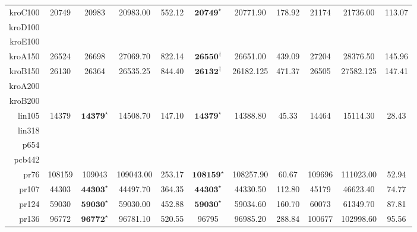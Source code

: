 \documentclass[12pt]{ctexart}
\begin{document}
\begin{table}[htbp]
\begin{tabular}{rcccccccccc}
        kroC100  & 20749            & 20983                             & 20983.00                    & 552.12                                 & $\textbf{20749}^\star$  & 20771.90         & 178.92           & 21174                 & 21736.00         & 113.07           \\
        kroD100 \\
        kroE100 \\
        kroA150  & 26524            & 26698                             & 27069.70                    & 822.14                                 & $\textbf{26550}^\dag$   & 26651.00         & 439.09           & 27204                 & 28376.50         & 145.96           \\
        kroB150  & 26130            & 26364                             & 26535.25                    & 844.40                                 & $\textbf{26132}^\dag$   & 26182.125        & 471.37           & 26505                 & 27582.125        & 147.41           \\
        kroA200 \\
        kroB200 \\ 
        lin105   & 14379            & $\textbf{14379}^\star$            & 14508.70                    & 147.10                                 & $\textbf{14379}^\star$  & 14388.80         & 45.33            & 14464                 & 15114.30         & 28.43            \\
        lin318 \\
        p654 \\
        pcb442 \\
        pr76     & 108159           & 109043                            & 109043.00                   & 253.17                                 & $\textbf{108159}^\star$ & 108257.90        & 60.67            & 109696                & 111023.00        & 52.94            \\
        pr107    & 44303            & $\textbf{44303}^\star$            & 44497.70                    & 364.35                                 & $\textbf{44303}^\star$  & 44330.50         & 112.80           & 45179                 & 46623.40         & 74.77            \\
        pr124    & 59030            & $\textbf{59030}^\star$            & 59030.00                    & 452.88                                 & $\textbf{59030}^\star$  & 59034.60         & 160.70           & 60073                 & 61349.70         & 87.81            \\
        pr136    & 96772            & $\textbf{96772}^\star$            & 96781.10                    & 520.55                                 & 96795                   & 96985.20         & 288.84           & 100677                & 102998.60        & 95.56            \\

\end{tabular}
\end{table}
\end{document}
